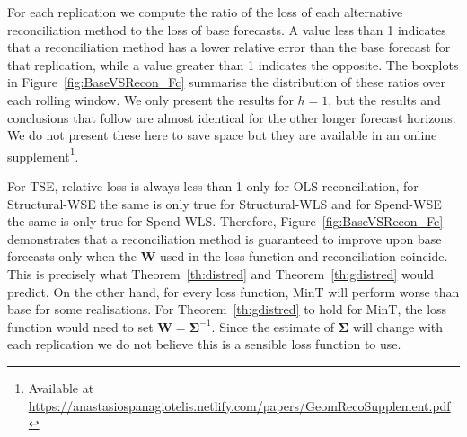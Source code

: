 \documentclass[12pt]{article}
\theoremstyle{definition}
\begin{document}
{\color{blue} For each replication we compute the ratio of the loss of each alternative reconciliation method to the loss of base forecasts. A value less than 1 indicates that a reconciliation method has a lower relative error than the base forecast for that replication, while a value greater than 1 indicates the opposite. The boxplots in Figure~\ref{fig:BaseVSRecon_Fc} summarise the distribution of these ratios over each rolling window. We only present the results for $h=1$, but the results and conclusions that follow are almost identical for the other longer forecast horizons. We do not present these here to save space but they are available in an online supplement\footnote{Available at \url{https://anastasiospanagiotelis.netlify.com/papers/GeomRecoSupplement.pdf}}.

For TSE, relative loss is always less than 1 only for OLS reconciliation, for Structural-WSE the same is only true for Structural-WLS and for Spend-WSE the same is only true for Spend-WLS.  Therefore, Figure~\ref{fig:BaseVSRecon_Fc} demonstrates that a reconciliation method is guaranteed to improve upon base forecasts only when the $\bm{W}$ used in the loss function and reconciliation coincide.  This is precisely what Theorem~\ref{th:distred} and Theorem~\ref{th:gdistred} would predict.  On the other hand, for every loss function, MinT will perform worse than base for some realisations.  For Theorem~\ref{th:gdistred} to hold for MinT, the loss function would need to set $\bm{W}=\bm{\Sigma}^{-1}$. Since the estimate of ${\bm\Sigma}$ will change with each replication we do not believe this is a sensible loss function to use.


}

\end{document}
